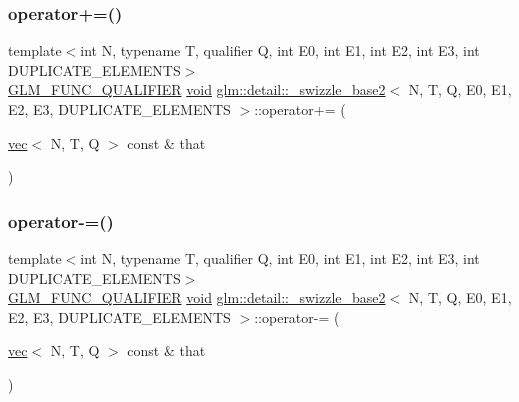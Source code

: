 \mbox{\label{structglm_1_1detail_1_1__swizzle__base2_a4c22bf1dde634b274789b630f75af0f1}} 
\subsubsection{\texorpdfstring{operator+=()}{operator+=()}}
{\footnotesize\ttfamily template$<$int N, typename T, qualifier Q, int E0, int E1, int E2, int E3, int D\+U\+P\+L\+I\+C\+A\+T\+E\+\_\+\+E\+L\+E\+M\+E\+N\+TS$>$ \\
\hyperlink{setup_8hpp_a33fdea6f91c5f834105f7415e2a64407}{G\+L\+M\+\_\+\+F\+U\+N\+C\+\_\+\+Q\+U\+A\+L\+I\+F\+I\+ER} \hyperlink{_s_d_l__opengles2__gl2ext_8h_ae5d8fa23ad07c48bb609509eae494c95}{void} \hyperlink{structglm_1_1detail_1_1__swizzle__base2}{glm\+::detail\+::\+\_\+swizzle\+\_\+base2}$<$ N, T, Q, E0, E1, E2, E3, D\+U\+P\+L\+I\+C\+A\+T\+E\+\_\+\+E\+L\+E\+M\+E\+N\+TS $>$\+::operator+= (\begin{DoxyParamCaption}\item[{\hyperlink{structglm_1_1vec}{vec}$<$ N, T, Q $>$ const \&}]{that }\end{DoxyParamCaption})\hspace{0.3cm}{\ttfamily [inline]}}

\mbox{\label{structglm_1_1detail_1_1__swizzle__base2_a5e985ec8cbfa38395aa667eea74d2ca0}} 
\subsubsection{\texorpdfstring{operator-\/=()}{operator-=()}}
{\footnotesize\ttfamily template$<$int N, typename T, qualifier Q, int E0, int E1, int E2, int E3, int D\+U\+P\+L\+I\+C\+A\+T\+E\+\_\+\+E\+L\+E\+M\+E\+N\+TS$>$ \\
\hyperlink{setup_8hpp_a33fdea6f91c5f834105f7415e2a64407}{G\+L\+M\+\_\+\+F\+U\+N\+C\+\_\+\+Q\+U\+A\+L\+I\+F\+I\+ER} \hyperlink{_s_d_l__opengles2__gl2ext_8h_ae5d8fa23ad07c48bb609509eae494c95}{void} \hyperlink{structglm_1_1detail_1_1__swizzle__base2}{glm\+::detail\+::\+\_\+swizzle\+\_\+base2}$<$ N, T, Q, E0, E1, E2, E3, D\+U\+P\+L\+I\+C\+A\+T\+E\+\_\+\+E\+L\+E\+M\+E\+N\+TS $>$\+::operator-\/= (\begin{DoxyParamCaption}\item[{\hyperlink{structglm_1_1vec}{vec}$<$ N, T, Q $>$ const \&}]{that }\end{DoxyParamCaption})\hspace{0.3cm}{\ttfamily [inline]}}

